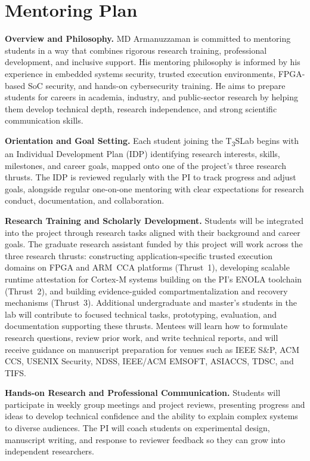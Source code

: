 \documentclass[11pt,onecolumn]{article}
\begin{document}
\section*{Mentoring Plan}
\label{sec:mentoring}

\textbf{Overview and Philosophy.} MD Armanuzzaman is committed to mentoring students in a way that combines rigorous research training, professional development, and inclusive support. His mentoring philosophy is informed by his experience in embedded systems security, trusted execution environments, FPGA-based SoC security, and hands-on cybersecurity training. He aims to prepare students for careers in academia, industry, and public-sector research by helping them develop technical depth, research independence, and strong scientific communication skills.

\textbf{Orientation and Goal Setting.} Each student joining the T\textsubscript{3}SLab begins with an Individual Development Plan (IDP) identifying research interests, skills, milestones, and career goals, mapped onto one of the project's three research thrusts. The IDP is reviewed regularly with the PI to track progress and adjust goals, alongside regular one-on-one mentoring with clear expectations for research conduct, documentation, and collaboration.

\textbf{Research Training and Scholarly Development.} Students will be integrated into the project through research tasks aligned with their background and career goals. The graduate research assistant funded by this project will work across the three research thrusts: constructing application-specific trusted execution domains on FPGA and ARM~CCA platforms (Thrust~1), developing scalable runtime attestation for Cortex-M systems building on the PI's ENOLA toolchain (Thrust~2), and building evidence-guided compartmentalization and recovery mechanisms (Thrust~3). Additional undergraduate and master's students in the lab will contribute to focused technical tasks, prototyping, evaluation, and documentation supporting these thrusts. Mentees will learn how to formulate research questions, review prior work, and write technical reports, and will receive guidance on manuscript preparation for venues such as IEEE S\&P, ACM CCS, USENIX Security, NDSS, IEEE/ACM EMSOFT, ASIACCS, TDSC, and TIFS.

\textbf{Hands-on Research and Professional Communication.} Students will participate in weekly group meetings and project reviews, presenting progress and ideas to develop technical confidence and the ability to explain complex systems to diverse audiences. The PI will coach students on experimental design, manuscript writing, and response to reviewer feedback so they can grow into independent researchers.
\end{document}
